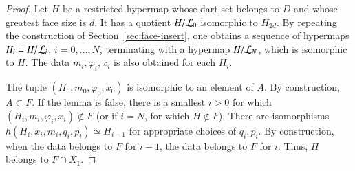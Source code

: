 \begin{proof} Let $H$ be a restricted hypermap whose dart set belongs
to $D$ and whose greatest face size is $d$.  It has a quotient
$H/{\cal L}_0$ isomorphic to $H_{2d}$.  By repeating the
construction of Section~\ref{sec:face-insert}, one obtains a
sequence of hypermaps $H_i = H/{\cal L}_i$, $i=0,\ldots,N$,
terminating with a hypermap $H/{\cal L}_N$, which is isomorphic to
$H$.  The data $m_i,\varphi_i,x_i$ is also obtained for each $H_i$.

The tuple $(H_0,m_0,\varphi_0,x_0)$ is isomorphic to an element of
$A$.  By construction, $A\subset F$.  If the lemma is false, there
is a smallest $i>0$ for which $(H_i,m_i,\varphi_i,x_i)\not\in F$ (or
if $i=N$, for which $H\not\in F$).  There are isomorphisms
$h(H_i,x_i,m_i,q_i,p_i) \simeq H_{i+1}$ for appropriate choices of
$q_i,p_i$.  By construction, when the data belongs to $F$ for $i-1$,
the data belongs to $F$ for $i$.  Thus, $H$ belongs to $F\cap X_1$.
\end{proof}

